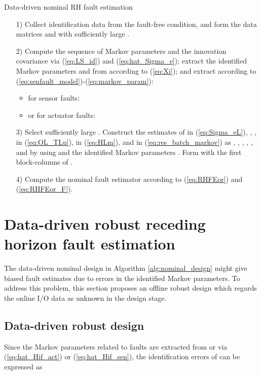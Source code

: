 \documentclass[twocolumn]{autart}
\begin{document}
\begin{algorithm}
  \caption{Data-driven nominal RH fault estimation}
  \label{alg:nominal_design}
  \begin{algorithmic}
    \State
    \begin{enumerate}
      \item[1)] Collect identification data from the fault-free condition, and form the data matrices  and  with sufficiently large  \cite{Veen2012}.
      \item[2)] Compute the sequence of Markov parameters  and the innovation covariance  via  (\ref{eq:LS_id}) and (\ref{eq:hat_Sigma_e}); extract the identified Markov parameters  and  from  according to (\ref{eq:Xi}); and extract  according to (\ref{eq:senfault_model})-(\ref{eq:markov_param}):
			\begin{itemize}
				\item for  sensor faults:
					
				\item or for  actuator faults:
					
			\end{itemize}
      \item[3)] Select sufficiently large .
          Construct the estimates of  in (\ref{eq:Sigma_eL}), , ,  in (\ref{eq:OL_TLu}),  in (\ref{eq:HLm}), and  in (\ref{eq:res_batch_markov}) as , , , , , and  by using
           and the identified Markov parameters . Form  with the first  block-columns of .
      \item[4)] Compute the nominal fault estimator according to (\ref{eq:RHFEor}) and (\ref{eq:RHFEor_F}).
    \end{enumerate}
  \end{algorithmic}
\end{algorithm}


\section{Data-driven robust receding horizon fault estimation}\label{sect:dd_robust}
The data-driven nominal design in Algorithm \ref{alg:nominal_design} might give biased fault estimates due to errors in the identified Markov parameters. To address this problem, this section proposes an offline robust design which regards the online I/O data as unknown in the design stage.


\subsection{Data-driven robust design}
Since the Markov parameters related to faults are extracted from  or  via (\ref{eq:hat_Hif_act}) or (\ref{eq:hat_Hif_sen}), the identification errors of  can be  expressed as
\end{document}
